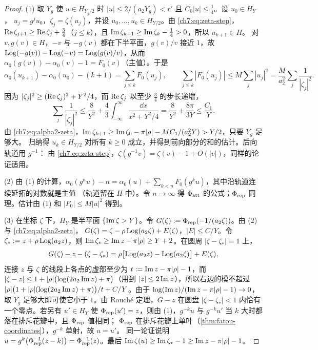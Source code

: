 \begin{proof}
(1) 取 $Y_g$ 使 $u\in H_{Y_g/2}$ 时 $|u|\le 2/(a_2Y_g)<r'$ 且 $C_0|u|\le\frac14$。设 $u_0\in H_Y$，
$u_j=g^ju_0$，$\zeta_j=\zeta(u_j)$，并设 $u_0,\dots,u_k\in H_{Y/2}$。由 \eqref{ch7:eq:zeta-step}，
$\operatorname{Re}\zeta_{j+1}\ge\operatorname{Re}\zeta_j+\frac34$（$j\le k$），且 $\operatorname{Im}\zeta_{k+1}\ge\operatorname{Im}\zeta_k-\frac14>0$，所以 $u_{k+1}\in H$。
对 $v,g(v)\in H$，$-v$ 与 $-g(v)$ 都在下半平面，$g(v)/v$ 接近 $1$，故
$\operatorname{Log}(-g(v))-\operatorname{Log}(-v)=\operatorname{Log}(g(v)/v)$，从而 $\alpha_0(g(v))-\alpha_0(v)-1=F_0(v)$（主值）。于是
\[
 \alpha_0(u_{k+1})-\alpha_0(u_0)-(k+1)=\sum_{j\le k}F_0(u_j),\qquad
 \sum_{j\le k}|F_0(u_j)|\le M\sum_j|u_j|^2=\frac M{a_2^2}\sum_j\frac1{|\zeta_j|^2}.
\]
因为 $|\zeta_j|^2\ge(\operatorname{Re}\zeta_j)^2+Y^2/4$，而 $\operatorname{Re}\zeta_j$ 以至少 $\frac34$ 的步长递增，
\[
 \sum_j\frac1{|\zeta_j|^2}\le\frac{8}{Y^2}+\frac43\int_{-\infty}^\infty\frac{\dd x}{x^2+Y^2/4}=\frac8{Y^2}+\frac{8\pi}{3Y}\le\frac{C_1}{Y}.
\]
由 \eqref{ch7:eq:alpha2-zeta}，$\operatorname{Im}\zeta_{k+1}\ge\operatorname{Im}\zeta_0-\pi|\rho|-MC_1/(a_2^2Y)>Y/2$，只要 $Y_g$ 足够大。
归纳得 $u_k\in H_{Y/2}$ 对所有 $k\ge0$ 成立，并得到前向部分的和的估计。后向轨道用 $g^{-1}$：
由 \eqref{ch7:eq:zeta-step}，$\zeta(g^{-1}v)=\zeta(v)-1+O(|v|)$，同样的论证适用。

(2) 由 (1) 的计算，$\alpha_0(g^nu)-n=\alpha_0(u)+\sum_{k<n}F_0(g^ku)$，其中沿轨道连续延拓的对数就是主值
（轨道留在 $H$ 中）。令 $n\to\infty$ 得 $\Phi_{\mathrm{att}}$ 的公式；$\Phi_{\mathrm{rep}}$ 同理。估计由 (1) 和 $|F_0|\le M|u|^2$ 得到。

(3) 在坐标 $\zeta$ 下，$H_Y$ 是半平面 $\{\operatorname{Im}\zeta>Y\}$。令 $G(\zeta):=\Phi_{\mathrm{rep}}(-1/(a_2\zeta))$。由 (2) 与 \eqref{ch7:eq:alpha2-zeta}，
$G(\zeta)=\zeta-\rho\operatorname{Log}(a_2\zeta)+E(\zeta)$，$|E|\le C/Y$。令 $\zeta_*:=z+\rho\operatorname{Log}(a_2z)$，则
$\operatorname{Im}\zeta_*\ge\operatorname{Im} z-\pi|\rho|\ge Y+2$。在圆周 $|\zeta-\zeta_*|=1$ 上，
\[
 G(\zeta)-z-(\zeta-\zeta_*)=\rho\bigl[\operatorname{Log}(a_2z)-\operatorname{Log}(a_2\zeta)\bigr]+E(\zeta),
\]
连接 $z$ 与 $\zeta$ 的线段上各点的虚部至少为 $t:=\operatorname{Im} z-\pi|\rho|-1$，而
$|\zeta-z|\le1+|\rho|\bigl(\log(2a_2\operatorname{Im} z)+\pi\bigr)$（用到 $|z|\le2\operatorname{Im} z$），所以右边的模不超过
$|\rho|\bigl(1+|\rho|(\log(2a_2\operatorname{Im} z)+\pi)\bigr)/t+C/Y$。由于 $\log(\operatorname{Im} z)/(\operatorname{Im} z-\pi|\rho|-1)\to0$，取 $Y_g$ 足够大即可使它小于 $1$。由 Rouché 定理，$G-z$ 在圆盘 $|\zeta-\zeta_*|<1$ 内恰有一个零点。若另有 $u'\in H_Y$ 使
$\Phi_{\mathrm{rep}}(u')=z$，则由 (1)，$g^{-k}u$ 与 $g^{-k}u'$ 当 $k$ 大时都落在排斥花瓣中，且 $\Phi_{\mathrm{rep}}$ 值相同；
$\Phi_{\mathrm{rep}}$ 在排斥花瓣上单叶（\cref{thm:fatou-coordinates}），$g^{-k}$ 单射，故 $u=u'$。
同一论证说明 $u=g^k\bigl(\Phi_{\mathrm{rep}}^{-1}(z-k)\bigr)=\Phi_{\mathrm{rep}}^{-1}(z)$。最后
$\operatorname{Im}\zeta(u)\ge\operatorname{Im}\zeta_*-1\ge\operatorname{Im} z-\pi|\rho|-1$。


\end{proof}
